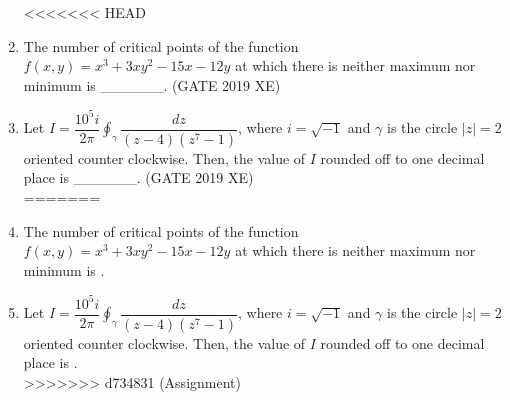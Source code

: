 \documentclass[journal,12pt,onecolumn]{IEEEtran}
\begin{document}
\begin{enumerate}
\begin{multicols}{2}
<<<<<<< HEAD
\end{multicols}

\item The number of critical points of the function $f(x,y)=x^3+3xy^2-15x-12y$ at which there is neither maximum nor minimum is \_\_\_\_\_\_.
\hfill{(GATE 2019 XE)} \\

\item Let $I=\dfrac{10^5i}{2\pi}\oint_{\gamma}\dfrac{dz}{(z-4)(z^7-1)}$, where $i=\sqrt{-1}$ and $\gamma$ is the circle $|z|=2$ oriented counter clockwise. Then, the value of $I$ rounded off to one decimal place is \_\_\_\_\_\_.
\hfill{(GATE 2019 XE)} \\
=======

\vspace{0.5cm}

\item The number of critical points of the function $f(x,y)=x^3+3xy^2-15x-12y$ at which there is neither maximum nor minimum is \underline{\hspace{2cm}}.
\hfill{} \\

\vspace{0.5cm}

\item Let $I=\dfrac{10^5i}{2\pi}\oint_{\gamma}\dfrac{dz}{(z-4)(z^7-1)}$, where $i=\sqrt{-1}$ and $\gamma$ is the circle $|z|=2$ oriented counter clockwise. Then, the value of $I$ rounded off to one decimal place is \underline{\hspace{2cm}}.
\hfill{} \\
>>>>>>> d734831 (Assignment)

\end{enumerate}
\end{document}
